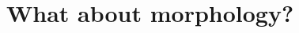 \documentclass{article}
\begin{document}





\section{What about morphology?}\label{sec:ObjMorphology}
\end{document}
